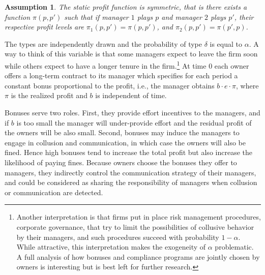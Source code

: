 \documentclass[]{article}
\newtheorem{assumption}{Assumption}
\begin{document}
\begin{assumption}\label{sym}
The static profit function is symmetric, that is there exists a function $\pi(p,p')$ such that if manager $1$ plays $p$ and manager $2$ plays $p'$, their respective profit levels are $\pi_1(p,p')=\pi(p,p')$, and $\pi_2(p,p')=\pi(p',p)$.
\end{assumption}

The types are independently drawn and the probability of type $\delta$ is equal to $\alpha$. A way to think of this variable is that some managers expect to leave the firm soon while others expect to have a longer tenure in the firm.\footnote{%
Another interpretation is that firms put in place risk management procedures, corporate governance, that try to limit the possibilities of collusive behavior by their managers, and such procedures succeed with probability $1-\alpha$.
While attractive, this interpretation makes the exogeneity of $\alpha$ problematic. A full analysis of how bonuses and compliance programs are jointly chosen by owners is interesting but is best left for further research.
}
At time 0 each owner offers a long-term contract to its manager which specifies for each period a constant bonus proportional to the profit, i.e., the manager obtains $b\cdot e \cdot \pi$, where $\pi$ is the realized profit and $b$ is independent of time.

Bonuses serve two roles. First, they provide effort incentives to the managers, and if $b$ is too small the manager will under-provide effort and the residual profit of the owners will be also small. Second, bonuses may induce the managers to engage in collusion and communication, in which case the owners will also be fined. Hence high bonuses tend to increase the total profit but also increase the likelihood of paying fines. Because owners choose the bonuses they offer to managers, they indirectly control the communication strategy of their managers, and could be considered as sharing the responsibility of managers when collusion or communication are detected.  %
\end{document}

